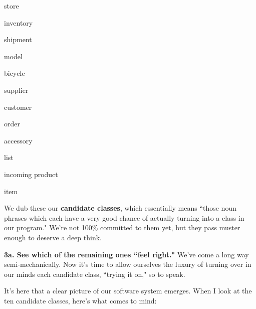 \vspace{-.2in}
\begin{samepage}
\begin{center}
\parbox{.8\textwidth}{
\begin{multicols}{2}
\begin{compactitem}
\item \textsf{store}
\item \textsf{inventory}
\item \textsf{shipment}
\item \textsf{model}
\item \textsf{bicycle}
\item \textsf{supplier}
\columnbreak
\item \textsf{customer}
\item \textsf{order}
\item \textsf{accessory}
\item \textsf{list}
\item \textsf{incoming product}
\item \textsf{item}
\end{compactitem}
\end{multicols}
}
\end{center}
\end{samepage}
\vspace{-.1in}

We dub these our \textbf{candidate classes}, which essentially means ``those
noun phrases which each have a very good chance of actually turning into a
class in our program." We're not 100\% committed to them yet, but they pass
muster enough to deserve a deep think.

\vspace{.3in}

\pagebreak
\textbf{3a. See which of the remaining ones ``feel right."} We've come a long
way semi-mechanically. Now it's time to allow ourselves the luxury of turning
over in our minds each candidate class, ``trying it on," so to speak. 

It's here that a clear picture of our software system emerges. When I look at
the ten candidate classes, here's what comes to mind:

